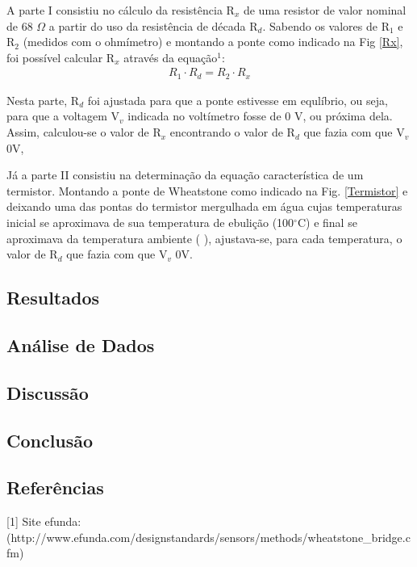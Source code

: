 \documentclass[12pt]{article}
\begin{document}
    
    A parte I consistiu no cálculo da resistência R$_x$ de uma resistor de valor nominal de 68 $\Omega$ a partir do uso da resistência de década R$_d$. Sabendo os valores de R$_1$ e R$_2$ (medidos com o ohmímetro) e montando a ponte como indicado na Fig \ref{Rx}, foi possível calcular R$_x$ através da equação$^1$:    
    \begin{align}
        R_1 \cdot R_d = R_2 \cdot R_x
        \label{Encontrando Rx}
    \end{align}
    
    Nesta parte, R$_d$ foi ajustada para que a ponte estivesse em equlíbrio, ou seja, para que a voltagem V$_v$ indicada no voltímetro fosse de 0 V, ou próxima dela. Assim, calculou-se o valor de R$_x$ encontrando o valor de R$_d$ que fazia com que V$_v$ \approx 0V, 
    
    Já a parte II consistiu na determinação da equação característica de um termistor. Montando a ponte de Wheatstone como indicado na Fig. \ref{Termistor} e deixando uma das pontas do termistor mergulhada em água cujas temperaturas inicial se aproximava de sua temperatura de ebulição (100$^{\circ}$C) e final se aproximava da temperatura ambiente 
    (%
    ), ajustava-se, para cada temperatura, o valor de R$_d$ que fazia com que V$_v$ \approx 0V.
    
    
    \subsection*{Resultados}
    
        
    
    
    \subsection*{Análise de Dados}
        
        
    
    
    \subsection*{Discussão}
        
       
    
    
    \subsection*{Conclusão}
        
       
    
    
    \subsection*{Referências}
    [1] Site efunda:
    (http://www.efunda.com/designstandards/sensors/methods/wheatstone_bridge.cfm)
           
\end{document}
